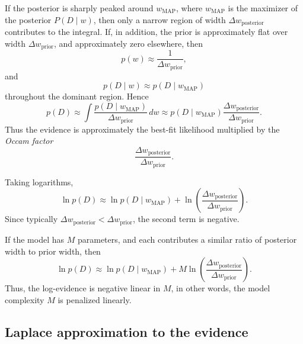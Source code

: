 \documentclass[11pt, titlepage]{article} %
\numberwithin{equation}{section}
\theoremstyle{definition}
\numberwithin{assumption}{section}
\begin{document}
If the posterior is sharply peaked around $w_{\mathrm{MAP}}$, where $w_{\mathrm{MAP}}$ is the maximizer of the posterior $P(D\mid w)$, then only a narrow region of width $\Delta w_{\mathrm{posterior}}$ contributes to the integral. If, in addition, the prior is approximately flat over width $\Delta w_{\mathrm{prior}}$, and approximately zero elsewhere, then
\begin{equation*}
    p(w)\approx \frac{1}{\Delta w_{\mathrm{prior}}},
\end{equation*}
and
\begin{equation*}
    p(D\mid w)\approx 
    p(D\mid w_{\mathrm{MAP}})
\end{equation*}
throughout the dominant region. Hence
\begin{equation*}
    p(D)\approx\int\frac{p(D\mid w_{\mathrm{MAP}})}{\Delta w_{\mathrm{prior}}}\, dw\approx p(D\mid w_{\mathrm{MAP}})
    \frac{\Delta w_{\mathrm{posterior}}}{\Delta w_{\mathrm{prior}}}.
\end{equation*}
Thus the evidence is approximately the best-fit likelihood multiplied by the \textit{Occam factor}
\begin{equation*}
     \frac{\Delta w_{\mathrm{posterior}}}{\Delta w_{\mathrm{prior}}}.
\end{equation*}




Taking logarithms,
\begin{equation*}
    \ln p(D)
    \approx
    \ln p(D\mid w_{\mathrm{MAP}})
    +
    \ln\!\left(\frac{\Delta w_{\mathrm{posterior}}}{\Delta w_{\mathrm{prior}}}\right).
\end{equation*}
Since typically $\Delta w_{\mathrm{posterior}} < \Delta w_{\mathrm{prior}}$, the second term is negative.


If the model has $M$ parameters, and each contributes a similar ratio of posterior width to prior width, then
\begin{equation*}
    \ln p(D)
    \approx
    \ln p(D\mid w_{\mathrm{MAP}})
    +
    M\ln\!\left(\frac{\Delta w_{\mathrm{posterior}}}{\Delta w_{\mathrm{prior}}}\right).
\end{equation*}
Thus, the log-evidence is negative linear in $M$, in other words, the model complexity $M$ is penalized linearly. 






\subsection{Laplace approximation to the evidence}
\end{document}
